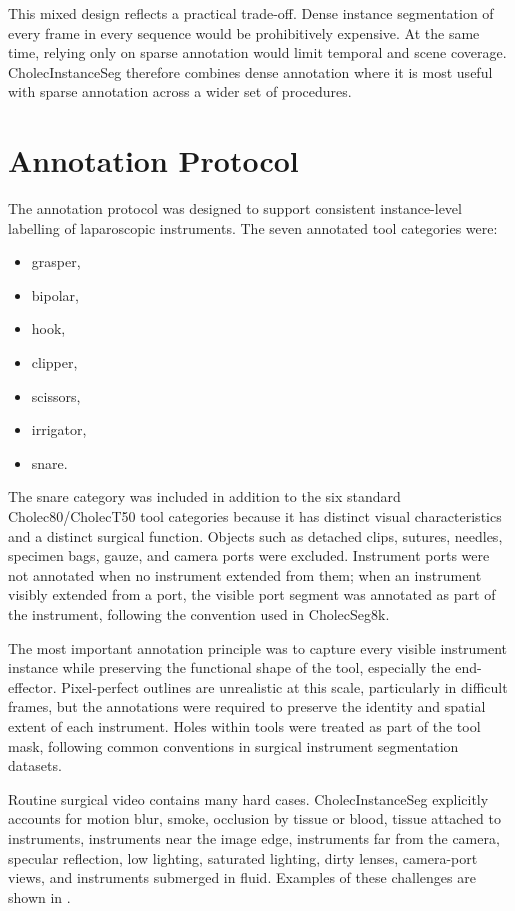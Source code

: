 This mixed design reflects a practical trade-off. Dense instance segmentation of every frame in every sequence would be prohibitively expensive. At the same time, relying only on sparse annotation would limit temporal and scene coverage. CholecInstanceSeg therefore combines dense annotation where it is most useful with sparse annotation across a wider set of procedures.

\section{Annotation Protocol}
\label{sec:cholecinstanceseg-annotation}

The annotation protocol was designed to support consistent instance-level labelling of laparoscopic instruments. The seven annotated tool categories were:

\begin{itemize}
\item grasper,
\item bipolar,
\item hook,
\item clipper,
\item scissors,
\item irrigator,
\item snare.
\end{itemize}

The snare category was included in addition to the six standard Cholec80/CholecT50 tool categories because it has distinct visual characteristics and a distinct surgical function. Objects such as detached clips, sutures, needles, specimen bags, gauze, and camera ports were excluded. Instrument ports were not annotated when no instrument extended from them; when an instrument visibly extended from a port, the visible port segment was annotated as part of the instrument, following the convention used in CholecSeg8k.

The most important annotation principle was to capture every visible instrument instance while preserving the functional shape of the tool, especially the end-effector. Pixel-perfect outlines are unrealistic at this scale, particularly in difficult frames, but the annotations were required to preserve the identity and spatial extent of each instrument. Holes within tools were treated as part of the tool mask, following common conventions in surgical instrument segmentation datasets.

Routine surgical video contains many hard cases. CholecInstanceSeg explicitly accounts for motion blur, smoke, occlusion by tissue or blood, tissue attached to instruments, instruments near the image edge, instruments far from the camera, specular reflection, low lighting, saturated lighting, dirty lenses, camera-port views, and instruments submerged in fluid. Examples of these challenges are shown in .

